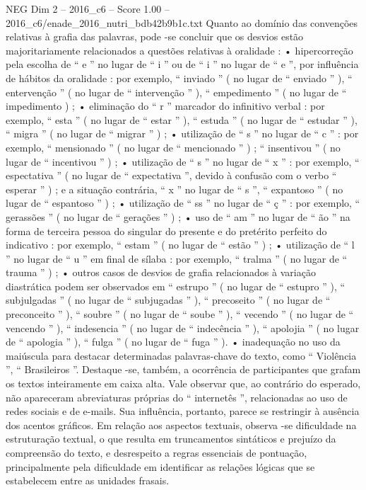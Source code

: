 \begin{textsample}{NEG Dim 2 – 2016\_c6 – Score 1.00 – 2016\_c6/enade\_2016\_nutri\_bdb42b9b1c.txt}
Quanto ao domínio das convenções relativas à grafia das palavras, pode -se concluir que os desvios estão majoritariamente relacionados a questões relativas à oralidade : • hipercorreção pela escolha de “ e ” no lugar de “ i ” ou de “ i ” no lugar de “ e ”, por influência de hábitos da oralidade : por exemplo, “ inviado ” ( no lugar de “ enviado ” ), “ entervenção ” ( no lugar de “ intervenção ” ), “ empedimento ” ( no lugar de “ impedimento ) ; • eliminação do “ r ” marcador do infinitivo verbal : por exemplo, “ esta ” ( no lugar de “ estar ” ), “ estuda ” ( no lugar de “ estudar ” ), “ migra ” ( no lugar de “ migrar ” ) ; • utilização de “ s ” no lugar de “ c ” : por exemplo, “ mensionado ” ( no lugar de “ mencionado ” ) ; “ insentivou ” ( no lugar de “ incentivou ” ) ; • utilização de “ s ” no lugar de “ x ” : por exemplo, “ espectativa ” ( no lugar de “ expectativa ”, devido à confusão com o verbo “ esperar ” ) ; e a situação contrária, “ x ” no lugar de “ s ”, “ expantoso ” ( no lugar de “ espantoso ” ) ; • utilização de “ ss ” no lugar de “ ç ” : por exemplo, “ gerassões ” ( no lugar de “ gerações ” ) ; • uso de “ am ” no lugar de “ ão ” na forma de terceira pessoa do singular do presente e do pretérito perfeito do indicativo : por exemplo, “ estam ” ( no lugar de “ estão ” ) ; • utilização de “ l ” no lugar de “ u ” em final de sílaba : por exemplo, “ tralma ” ( no lugar de “ trauma ” ) ; • outros casos de desvios de grafia relacionados à variação diastrática podem ser observados em “ estrupo ” ( no lugar de “ estupro ” ), “ subjulgadas ” ( no lugar de “ subjugadas ” ), “ precoseito ” ( no lugar de “ preconceito ” ), “ soubre ” ( no lugar de “ soube ” ), “ vecendo ” ( no lugar de “ vencendo ” ), “ indesencia ” ( no lugar de “ indecência ” ), “ apolojia ” ( no lugar de “ apologia ” ), “ fulga ” ( no lugar de “ fuga ” ). • inadequação no uso da maiúscula para destacar determinadas palavras-chave do texto, como “ Violência ”, “ Brasileiros ”.
Destaque -se, também, a ocorrência de participantes que grafam os textos inteiramente em caixa alta.
Vale observar que, ao contrário do esperado, não apareceram abreviaturas próprias do “ internetês ”, relacionadas ao uso de redes sociais e de e-mails.
Sua influência, portanto, parece se restringir à ausência dos acentos gráficos.
Em relação aos aspectos textuais, observa -se dificuldade na estruturação textual, o que resulta em truncamentos sintáticos e prejuízo da compreensão do texto, e desrespeito a regras essenciais de pontuação, principalmente pela dificuldade em identificar as relações lógicas que se estabelecem entre as unidades frasais.

\end{textsample}
